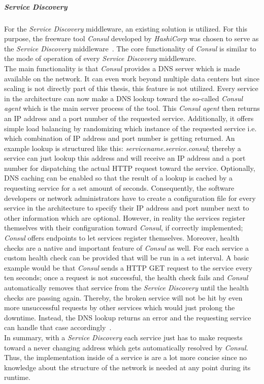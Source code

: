 \documentclass[12pt,a4paper,twoside]{report}
\begin{document}
\subparagraph{Service Discovery} \label{subparag:service-discovery}
For the \textit{Service Discovery} middleware, an existing solution is
utilized. For this purpose, the freeware tool \textit{Consul} developed
by \textit{HashiCorp} was chosen to serve as the \textit{Service Discovery}
middleware~\cite{consul}. The core functionality of \textit{Consul} is similar
to the mode of operation of every \textit{Service Discovery} middleware.\\
The main functionality is that \textit{Consul} provides a DNS server which is
made available on the network. It can even work beyond multiple data centers
but since scaling is not directly part of this thesis, this feature is not utilized.
Every service in the architecture can now make a DNS lookup toward the so-called
\textit{Consul agent} which is the main server process of the tool.
This \textit{Consul agent} then returns an IP address and a
port number of the requested service. Additionally, it offers simple
load balancing by randomizing which instance of the requested service
i.e. which combination of IP address and port number is getting returned.
An example lookup is structured like this: \textit{servicename.service.consul};
thereby a service can just lookup this address and will receive an IP address
and a port number for dispatching the actual HTTP request toward the service.
Optionally, DNS caching can be enabled so that the result of a lookup is
cached by a requesting service for a set amount of seconds.
Consequently, the software developers or network administrators have to
create a configuration file for every service in the architecture to specify
their IP address and port number next to other information which are optional.
However, in reality the services register themselves with their configuration
toward \textit{Consul}, if correctly implemented;
\textit{Consul} offers endpoints to let services register themselves.
Moreover, health checks are a native and important feature of \textit{Consul}
as well. For each service a custom health check can be provided that
will be run in a set interval. A basic example would be that \textit{Consul}
sends a HTTP GET request to the service every ten seconds;
once a request is not successful, the health check fails and \textit{Consul}
automatically removes that service from the \textit{Service Discovery}
until the health checks are passing again. Thereby, the broken service will
not be hit by even more unsuccessful requests by other services which would just
prolong the downtime. Instead, the DNS lookup returns an error and the
requesting service can handle that case accordingly~\cite{consul}.\\
In summary, with a \textit{Service Discovery} each service just has to
make requests toward a never changing address which gets automatically resolved by
\textit{Consul}. Thus, the implementation inside of a service is
are a lot more concise since no knowledge about the structure of the network
is needed at any point during its runtime.
\end{document}
